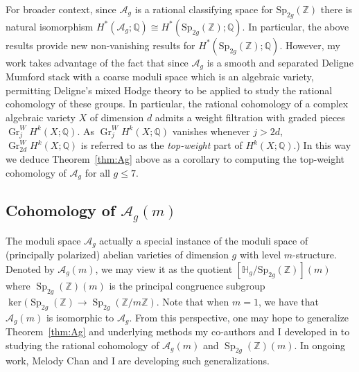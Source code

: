 \documentclass[11pt,reqno]{amsart}
\theoremstyle{remark}
\newcommand{\Gr}{\operatorname{Gr}}
\newcommand{\Sp}{\operatorname{Sp}}
\newcommand{\cA}{\mathcal{A}}
\newcommand{\cM}{\mathcal{M}}
\newcommand{\Q}{\mathbb{Q}}
\newcommand{\Z}{\mathbb{Z}}
\begin{document}
For broader context, since $\cA_g$ is a rational classifying space for $\mathrm{Sp}_{2g}(\Z)$ there is natural isomorphism $H^*(\cA_g;\Q) \cong H^*(\mathrm{Sp}_{2g}(\Z);\Q)$. In particular, the above results provide new non-vanishing results for $H^*(\mathrm{Sp}_{2g}(\Z);\Q)$. However, my work takes advantage of the fact that since $\cA_g$  is a smooth and separated Deligne Mumford stack with a coarse moduli space which is an algebraic variety, permitting Deligne's mixed Hodge theory to be applied to study the rational cohomology of these groups. In particular, the rational cohomology of a %
complex algebraic variety $X$ of dimension $d$ admits a weight filtration with graded pieces $\Gr_{j}^W\!H^k(X;\mathbb{Q})$. %
As $\Gr_{j}^W\!H^k(X;\mathbb{Q})$ vanishes whenever $j>2d$, $\Gr_{2d}^W\!H^k(X;\mathbb{Q})$ is referred to as the {\em top-weight} part of $H^k(X;\Q)$.)  In this way we deduce Theorem~\ref{thm:Ag} above as a corollary to computing the top-weight cohomology of $\cA_{g}$ for all $g\leq 7$.  







\subsection{Cohomology of $\cA_{g}(m)$}

The moduli space $\cA_{g}$ actually a special instance of the moduli space of (principally polarized) abelian varieties of dimension $g$ with level $m$-structure. Denoted by $\cA_{g}(m)$, we may view it as the quotient $[\mathbb{H}_g/\mathrm{Sp}_{2g}(\Z)](m)$  where $\Sp_{2g}(\Z)(m)$ is the principal congruence subgroup $\ker(\Sp_{2g}(\Z) \to \Sp_{2g}(\Z/m\Z)$. Note that when $m=1$, we have that $\cA_{g}(m)$ is isomorphic to $\cA_{g}$. From this perspective, one may hope to generalize Theorem~\ref{thm:Ag} and underlying methods my co-authors and I developed in \cite{BBCMMW22} to studying the rational cohomology of  $\cA_{g}(m)$ and $\Sp_{2g}(\Z)(m)$. In ongoing work, Melody Chan and I are developing such generalizations.
\end{document}
